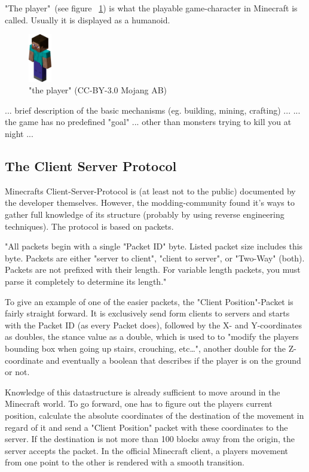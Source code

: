 "The player"~(see figure ~\ref{mc_player}) is what the playable game-character in Minecraft is called. Usually it is displayed as a humanoid.

\begin{figure}[h]
  \centering
    \includegraphics[width=1cm]{graphics/player}
  \caption{"the player" (CC-BY-3.0 Mojang AB) \cite{image_mob}}
  \label{mc_player}
\end{figure}

... brief description of the basic mechanisms (eg. building, mining, crafting) ...
... the game has no predefined "goal" ... other than monsters trying to kill you at night ...

        \subsection{The Client Server Protocol}
Minecrafts Client-Server-Protocol is (at least not to the public) documented by the developer themselves. However, the modding-community found it's ways to gather full knowledge of its structure (probably by using reverse engineering techniques). The protocol is based on packets. 

"All packets begin with a single "Packet ID" byte. Listed packet size includes this byte. Packets are either "server to client", "client to server", or "Two-Way" (both). Packets are not prefixed with their length. For variable length packets, you must parse it completely to determine its length." 

To give an example of one of the easier packets, the "Client Position"-Packet is fairly straight forward. It is exclusively send form clients to servers and starts with the Packet ID (as every Packet does), followed by the X- and Y-coordinates as doubles, the stance value as a double, which is used to to "modify the players bounding box when going up stairs, crouching, etc…", another double for the Z-coordinate and eventually a boolean that describes if the player is on the ground or not.~\cite{protocol}

Knowledge of this datastructure is already sufficient to move around in the Minecraft world. To go forward, one has to figure out the players current position, calculate the absolute coordinates of the destination of the movement in regard of it and send a "Client Position" packet with these coordinates to the server. If the destination is not more than 100 blocks away from the origin, the server accepts the packet. In the official Minecraft client, a players movement from one point to the other is rendered with a smooth transition.

